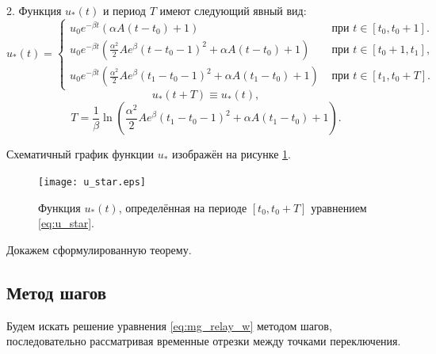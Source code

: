 \begin{theorem}
	2. Функция $u_*(t)$ и период $T$ имеют следующий явный вид: 
	\small
	\begin{equation}
		\label{eq:u_star}
		u_*(t)=
		\begin{cases}
			u_0 e^{-\beta t}(\alpha A(t-t_0)+1) & \text{ при } t\in[t_0,t_0+1].
			\\
			u_0 e^{-\beta t}\left(\frac{\alpha^2}{2}Ae^{\beta}(t-t_0-1)^2+\alpha A(t-t_0)+1\right) & \text{ при } t\in[t_0+1,t_1],
			\\
			u_0 e^{-\beta t}\left(\frac{\alpha^2}{2}Ae^{\beta}(t_1-t_0-1)^2+\alpha A(t_1-t_0)+1\right) & \text{ при } t\in[t_1,t_0+T].
		\end{cases}
	\end{equation}
	\normalsize
	\[
	u_*(t+T)\equiv u_*(t),
	\]
	\begin{equation}
		\label{eq:mg_period_T}
		T = \dfrac{1}{\beta}\ln\left( \frac{\alpha^2}{2}Ae^{\beta}(t_1-t_0-1)^2+\alpha A(t_1-t_0)+1\right). 
	\end{equation}
\end{theorem}

Схематичный график функции $u_*$ изображён на рисунке \ref{fig:u_star}.
%
\begin{figure}[h]
	\centering
	\texttt{[image: u\_star.eps]}
	\caption{Функция $u_*(t)$, определённая на периоде $[t_0, t_0 + T]$ уравнением \eqref{eq:u_star}.}
	\label{fig:u_star}
\end{figure}

Докажем сформулированную теорему.

\subsection{Метод шагов}

Будем искать решение уравнения \eqref{eq:mg_relay_w} методом шагов, последовательно рассматривая временные отрезки между точками переключения. 

